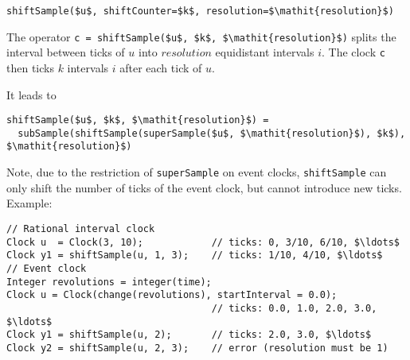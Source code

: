 \begin{operatordefinition}[shiftSample]
\begin{synopsis}\begin{lstlisting}
shiftSample($u$, shiftCounter=$k$, resolution=$\mathit{resolution}$)
\end{lstlisting}\end{synopsis}
\begin{semantics}
The operator \lstinline!c = shiftSample($u$, $k$, $\mathit{resolution}$)! splits the interval between ticks of $u$ into $\mathit{resolution}$ equidistant intervals $i$.  The clock \lstinline!c! then ticks $k$ intervals $i$ after each tick of $u$.

It leads to
\begin{lstlisting}[language=modelica]
shiftSample($u$, $k$, $\mathit{resolution}$) =
  subSample(shiftSample(superSample($u$, $\mathit{resolution}$), $k$), $\mathit{resolution}$)
\end{lstlisting}

\begin{nonnormative}
Note, due to the restriction of \lstinline!superSample! on event clocks, \lstinline!shiftSample! can only shift the number of ticks of the event clock, but cannot introduce new ticks.  Example:
\begin{lstlisting}[language=modelica]
// Rational interval clock
Clock u  = Clock(3, 10);            // ticks: 0, 3/10, 6/10, $\ldots$
Clock y1 = shiftSample(u, 1, 3);    // ticks: 1/10, 4/10, $\ldots$
// Event clock
Integer revolutions = integer(time);
Clock u = Clock(change(revolutions), startInterval = 0.0);
                                    // ticks: 0.0, 1.0, 2.0, 3.0, $\ldots$
Clock y1 = shiftSample(u, 2);       // ticks: 2.0, 3.0, $\ldots$
Clock y2 = shiftSample(u, 2, 3);    // error (resolution must be 1)
\end{lstlisting}
\end{nonnormative}
\end{semantics}
\end{operatordefinition}

